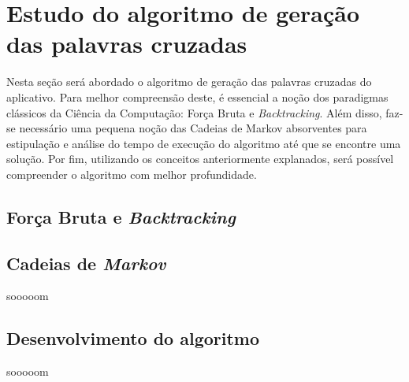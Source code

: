 \section{Estudo do algoritmo de geração das palavras cruzadas} 
Nesta seção será abordado o algoritmo de geração das palavras cruzadas do aplicativo. Para melhor compreensão deste, é essencial a noção dos paradigmas clássicos da Ciência da Computação: Força Bruta e \textit{Backtracking}. Além disso, faz-se necessário uma pequena noção das Cadeias de Markov absorventes para estipulação e análise do tempo de execução do algoritmo até que se encontre uma solução. Por fim, utilizando os conceitos anteriormente explanados, será possível compreender o algoritmo com melhor profundidade.

\subsection{Força Bruta e \textit{Backtracking}}


\subsection{Cadeias de \textit{Markov}}
sooooom

\subsection{Desenvolvimento do algoritmo}
sooooom